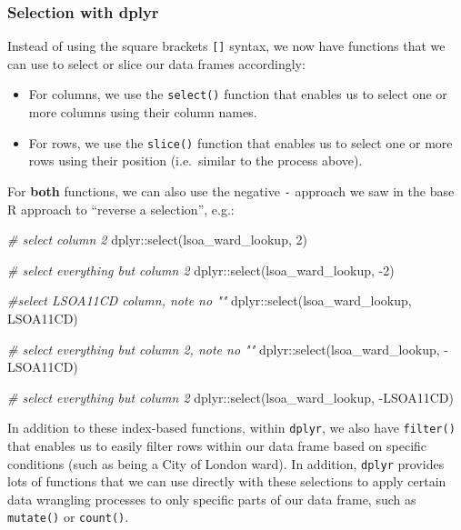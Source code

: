 \documentclass[
]{book}
\newenvironment{Shaded}{\begin{snugshade}}{\end{snugshade}}
\newcommand{\CommentTok}[1]{\textcolor[rgb]{0.56,0.35,0.01}{\textit{#1}}}
\newcommand{\DecValTok}[1]{\textcolor[rgb]{0.00,0.00,0.81}{#1}}
\newcommand{\FunctionTok}[1]{\textcolor[rgb]{0.00,0.00,0.00}{#1}}
\newcommand{\NormalTok}[1]{#1}
\newcommand{\SpecialCharTok}[1]{\textcolor[rgb]{0.00,0.00,0.00}{#1}}
\providecommand{\tightlist}{%
  \setlength{\itemsep}{0pt}\setlength{\parskip}{0pt}}
\begin{document}
\hypertarget{selection-with-dplyr}{%
\subsubsection{Selection with dplyr}\label{selection-with-dplyr}}

Instead of using the square brackets \texttt{{[}{]}} syntax, we now have functions that we can use to select or slice our data frames accordingly:

\begin{itemize}
\tightlist
\item
  For columns, we use the \texttt{select()} function that enables us to select one or more columns using their column names.
\item
  For rows, we use the \texttt{slice()} function that enables us to select one or more rows using their position (i.e.~similar to the process above).
\end{itemize}

For \textbf{both} functions, we can also use the negative \texttt{-} approach we saw in the base R approach to ``reverse a selection'', e.g.:

\begin{Shaded}
\begin{Highlighting}[]
\CommentTok{\# select column 2}
\NormalTok{dplyr}\SpecialCharTok{::}\FunctionTok{select}\NormalTok{(lsoa\_ward\_lookup, }\DecValTok{2}\NormalTok{)}

\CommentTok{\# select everything but column 2}
\NormalTok{dplyr}\SpecialCharTok{::}\FunctionTok{select}\NormalTok{(lsoa\_ward\_lookup, }\SpecialCharTok{{-}}\DecValTok{2}\NormalTok{)}

\CommentTok{\#select LSOA11CD column, note no ""}
\NormalTok{dplyr}\SpecialCharTok{::}\FunctionTok{select}\NormalTok{(lsoa\_ward\_lookup, LSOA11CD)}

\CommentTok{\# select everything but column 2, note no ""}
\NormalTok{dplyr}\SpecialCharTok{::}\FunctionTok{select}\NormalTok{(lsoa\_ward\_lookup, }\SpecialCharTok{{-}}\NormalTok{LSOA11CD)}

\CommentTok{\# select everything but column 2}
\NormalTok{dplyr}\SpecialCharTok{::}\FunctionTok{select}\NormalTok{(lsoa\_ward\_lookup, }\SpecialCharTok{{-}}\NormalTok{LSOA11CD)}
\end{Highlighting}
\end{Shaded}

In addition to these index-based functions, within \texttt{dplyr}, we also have \texttt{filter()} that enables us to easily filter rows within our data frame based on specific conditions (such as being a City of London ward). In addition, \texttt{dplyr} provides lots of functions that we can use directly with these selections to apply certain data wrangling processes to only specific parts of our data frame, such as \texttt{mutate()} or \texttt{count()}.
\end{document}

